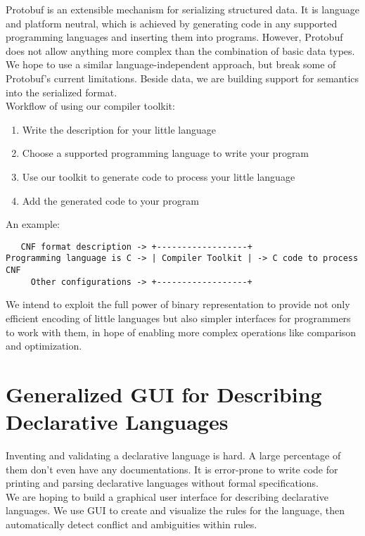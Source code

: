 \documentclass{article}
\begin{document}
Protobuf is an extensible mechanism for serializing structured data. It is language and platform neutral, which is achieved by generating code in any supported programming languages and inserting them into programs. However, Protobuf does not allow anything more complex than the combination of basic data types. We hope to use a similar language-independent approach, but break some of Protobuf's current limitations. Beside data, we are building support for semantics into the serialized format.\\

Workflow of using our compiler toolkit:
\begin{enumerate}
  \item Write the description for your little language
  \item Choose a supported programming language to write your program
  \item Use our toolkit to generate code to process your little language
  \item Add the generated code to your program
\end{enumerate}

An example:
\begin{lstlisting}
   CNF format description -> +------------------+
Programming language is C -> | Compiler Toolkit | -> C code to process CNF
     Other configurations -> +------------------+
\end{lstlisting}

We intend to exploit the full power of binary representation to provide not only efficient encoding of little languages but also simpler interfaces for programmers to work with them, in hope of enabling more complex operations like comparison and optimization.


\section{Generalized GUI for Describing Declarative Languages}

Inventing and validating a declarative language is hard. A large percentage of them don't even have any documentations. It is error-prone to write code for printing and parsing declarative languages without formal specifications.\\

We are hoping to build a graphical user interface for describing declarative languages. We use GUI to create and visualize the rules for the language, then automatically detect conflict and ambiguities within rules.\\
\end{document}
